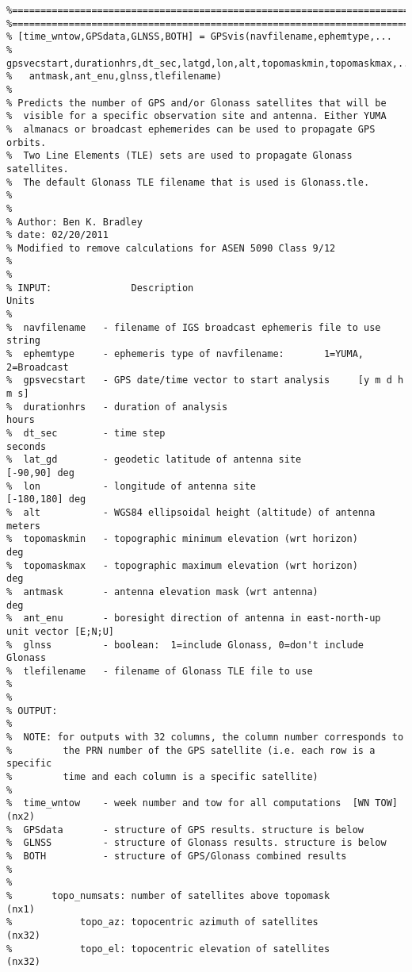 \documentclass[12pt,a4paper,oneside]{article}
\begin{document}
\begin{appendix}
\begin{lstlisting}
%==========================================================================
%==========================================================================
% [time_wntow,GPSdata,GLNSS,BOTH] = GPSvis(navfilename,ephemtype,...
%   gpsvecstart,durationhrs,dt_sec,latgd,lon,alt,topomaskmin,topomaskmax,...
%   antmask,ant_enu,glnss,tlefilename)
%
% Predicts the number of GPS and/or Glonass satellites that will be 
%  visible for a specific observation site and antenna. Either YUMA 
%  almanacs or broadcast ephemerides can be used to propagate GPS orbits. 
%  Two Line Elements (TLE) sets are used to propagate Glonass satellites. 
%  The default Glonass TLE filename that is used is Glonass.tle.
%
%
% Author: Ben K. Bradley
% date: 02/20/2011
% Modified to remove calculations for ASEN 5090 Class 9/12
%
%
% INPUT:              Description                                    Units
%
%  navfilename   - filename of IGS broadcast ephemeris file to use   string
%  ephemtype     - ephemeris type of navfilename:       1=YUMA, 2=Broadcast
%  gpsvecstart   - GPS date/time vector to start analysis     [y m d h m s]
%  durationhrs   - duration of analysis                               hours
%  dt_sec        - time step                                        seconds
%  lat_gd        - geodetic latitude of antenna site           [-90,90] deg
%  lon           - longitude of antenna site                 [-180,180] deg
%  alt           - WGS84 ellipsoidal height (altitude) of antenna    meters
%  topomaskmin   - topographic minimum elevation (wrt horizon)          deg
%  topomaskmax   - topographic maximum elevation (wrt horizon)          deg
%  antmask       - antenna elevation mask (wrt antenna)                 deg
%  ant_enu       - boresight direction of antenna in east-north-up unit vector [E;N;U]
%  glnss         - boolean:  1=include Glonass, 0=don't include Glonass
%  tlefilename   - filename of Glonass TLE file to use
%
%
% OUTPUT:       
%    
%  NOTE: for outputs with 32 columns, the column number corresponds to
%         the PRN number of the GPS satellite (i.e. each row is a specific
%         time and each column is a specific satellite)
%
%  time_wntow    - week number and tow for all computations  [WN TOW] (nx2)
%  GPSdata       - structure of GPS results. structure is below
%  GLNSS         - structure of Glonass results. structure is below
%  BOTH          - structure of GPS/Glonass combined results
%
%
%       topo_numsats: number of satellites above topomask             (nx1)
%            topo_az: topocentric azimuth of satellites              (nx32)
%            topo_el: topocentric elevation of satellites            (nx32)

\end{lstlisting}
\end{appendix}
\end{document}
